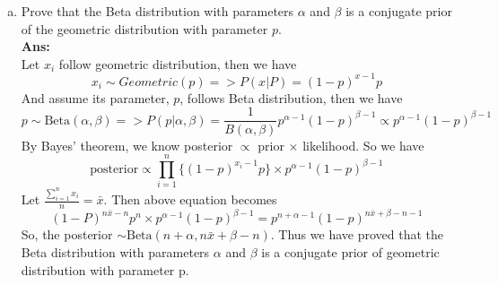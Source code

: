 \documentclass[11pt]{article}
\begin{document}
\begin{enumerate}[(a)]
\item Prove that the Beta distribution with parameters $\alpha$ and $\beta$ is a conjugate prior of the geometric distribution with parameter $p$.\\
\textbf{Ans:}\\
Let $x_i$ follow geometric distribution, then we have 
$$x_i \sim Geometric(p) => P(x|P) = (1-p)^{x-1}p$$
And assume its parameter, $p$, follows Beta distribution, then we have 
%
$$p \sim \text{Beta}(\alpha, \beta) 
=> P(p|\alpha, \beta) 
= \frac{1}{B(\alpha, \beta)}p^{\alpha -1}(1-p)^{\beta-1}
\propto p^{\alpha -1}(1-p)^{\beta-1}$$
%
By Bayes' theorem, we know posterior $\propto$ prior $\times$ likelihood. So we have\\
$$\text{posterior} \propto \prod\limits_{i=1}^n \{(1-p)^{x_i-1}p\} \times p^{\alpha -1}(1-p)^{\beta-1} 
$$
%
Let $\frac{\sum_{i=1}^{n} x_i}{n} = \bar{x}$. Then above equation becomes
$$
(1-P)^{n\bar{x}-n}p^n \times p^{\alpha - 1}(1-p)^{\beta-1} 
= p^{n+\alpha-1}(1-p)^{n\bar{x}+\beta-n-1}
$$
So, the posterior $\sim \text{Beta}(n+\alpha, n\bar{x}+\beta-n)$. Thus we have proved that the Beta distribution with parameters $\alpha$ and $\beta$ is a conjugate prior of geometric distribution with parameter p.







\end{enumerate}
\end{document}

